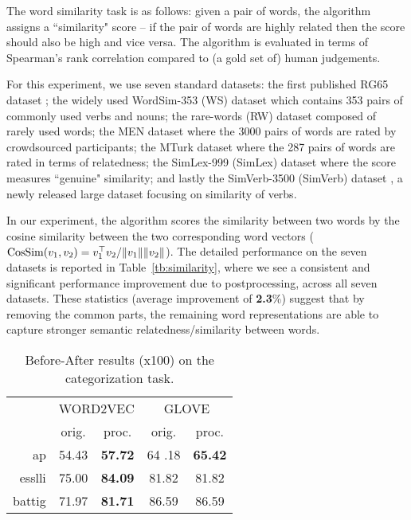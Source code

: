 \documentclass{article} \usepackage{acl2017,times}
\begin{document}
The  word similarity task is as follows: given a pair of words, the algorithm assigns a ``similarity" score -- if the pair of words are highly related then the score should also be high and vice versa. The algorithm is evaluated in terms of Spearman's rank correlation compared to (a gold set of) human judgements.

For this experiment, we use seven standard datasets: the first published RG65 dataset \citep{rubenstein1965contextual}; the widely used WordSim-353 (WS) dataset \citep{finkelstein2001placing} which contains 353 pairs of commonly used verbs and nouns; the rare-words (RW) dataset \citep{luong2013better} composed of rarely used words; the MEN dataset \citep{bruni2014multimodal} where the 3000 pairs of words are rated by crowdsourced participants; the MTurk dataset \citep{radinsky2011word} where the 287 pairs of words are rated in terms of relatedness;  the SimLex-999 (SimLex) dataset \citep{hill2016simlex} where the score measures ``genuine" similarity; and lastly the SimVerb-3500 (SimVerb) dataset \citep{gerz2016simverb}, a newly released large dataset focusing on similarity of verbs.



In our experiment, the algorithm scores the similarity between two words by the cosine similarity between the two corresponding word vectors (${\rm CosSim}(v_1,v_2) = v_1^{\top}v_2 / \|v_1\|\|v_2\|$).  
The detailed performance on the seven datasets is reported in Table~\ref{tb:similarity}, where we see   a consistent and significant performance improvement due to postprocessing, across all seven datasets. These statistics (average improvement of {\bf 2.3}\%) suggest that by removing the common parts, the remaining word representations are able to capture stronger semantic relatedness/similarity between words. 



\begin{wraptable}{l}{0.45\textwidth}
\vspace{-10pt}
\begin{tabular}{|r||c|c||c|c|}
\hline
\multirow{2}{*}{} & \multicolumn{2}{c||}{WORD2VEC} & \multicolumn{2}{c|}{GLOVE} \\ \cline{2-5} 
                  & orig.      & proc.     & orig.    & proc.    \\ \hline
ap     &     54.43 &    \bf  57.72 &    64
.18 & \bf 65.42  \\ \hline
esslli &     75.00 &     \bf 84.09 &    81.82 &  81.82    \\ \hline
battig &     71.97 &    \bf  81.71 &    86.59 &  86.59       \\ \hline
\end{tabular}
\caption{Before-After results (x100) on the categorization task.}
\label{tb:categorization}
\vspace{-10pt}
\end{wraptable}
\end{document}
